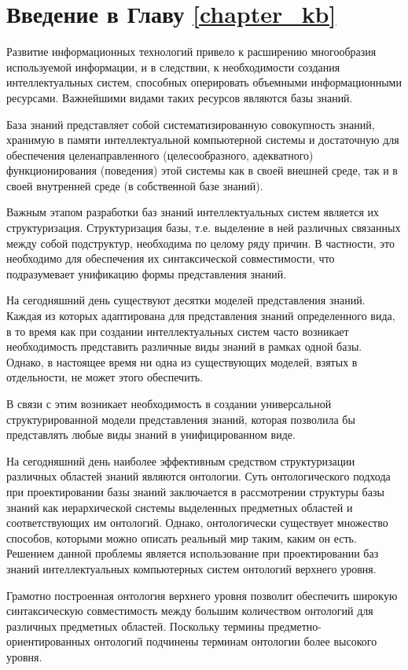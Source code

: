 \section*{Введение в Главу \ref{chapter_kb}}

Развитие информационных технологий привело к расширению многообразия используемой информации, и в следствии, к необходимости создания интеллектуальных систем, способных оперировать объемными информационными ресурсами. Важнейшими видами таких ресурсов являются базы знаний.

База знаний представляет собой систематизированную совокупность знаний, хранимую в памяти интеллектуальной компьютерной системы и достаточную для обеспечения целенаправленного (целесообразного, адекватного) функционирования (поведения) этой системы как в своей внешней среде, так и в своей внутренней среде (в собственной базе знаний).

Важным этапом разработки баз знаний интеллектуальных систем является их структуризация. Структуризация базы, т.е. выделение в ней различных связанных между собой подструктур, необходима по целому ряду причин. В частности, это необходимо для обеспечения их синтаксической совместимости, что подразумевает унификацию формы представления знаний.

На сегодняшний день существуют десятки моделей представления знаний. Каждая из которых адаптирована для представления знаний определенного вида, в то время как при создании интеллектуальных систем часто возникает необходимость представить различные виды знаний в рамках одной базы. Однако, в настоящее время ни одна из существующих моделей, взятых в отдельности, не может этого обеспечить. 

В связи с этим возникает необходимость в создании универсальной структурированной модели представления знаний, которая позволила бы представлять любые виды знаний в унифицированном виде.

На сегодняшний день наиболее эффективным средством структуризации различных областей знаний являются онтологии. Суть онтологического подхода при проектировании базы знаний заключается в рассмотрении структуры базы знаний как иерархической системы выделенных предметных областей и соответствующих им онтологий. Однако, онтологически существует множество способов, которыми можно описать реальный мир таким, каким он есть. Решением данной проблемы является использование при проектировании баз знаний интеллектуальных компьютерных систем онтологий верхнего уровня.

Грамотно построенная онтология верхнего уровня позволит обеспечить широкую синтаксическую совместимость между большим количеством онтологий для различных предметных областей. Поскольку термины предметно-ориентированных онтологий подчинены терминам онтологии более высокого уровня. 

